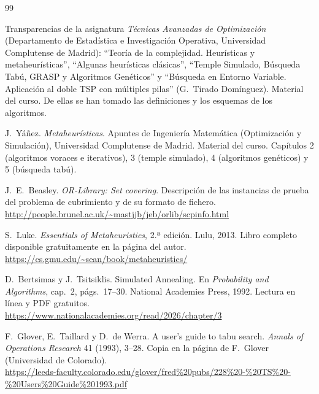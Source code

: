 \begin{thebibliography}{99}

Transparencias de la asignatura \emph{Técnicas Avanzadas de Optimización} (Departamento de
Estadística e Investigación Operativa, Universidad Complutense de Madrid): ``Teoría de la
complejidad. Heurísticas y metaheurísticas'', ``Algunas heurísticas clásicas'', ``Temple
Simulado, Búsqueda Tabú, GRASP y Algoritmos Genéticos'' y ``Búsqueda en Entorno Variable.
Aplicación al doble TSP con múltiples pilas'' (G.~Tirado Domínguez). Material del curso. De
ellas se han tomado las definiciones y los esquemas de los algoritmos.

J.~Yáñez. \emph{Metaheurísticas}. Apuntes de Ingeniería Matemática (Optimización y
Simulación), Universidad Complutense de Madrid. Material del curso. Capítulos 2 (algoritmos
voraces e iterativos), 3 (temple simulado), 4 (algoritmos genéticos) y 5 (búsqueda tabú).

J.~E.~Beasley. \emph{OR-Library: Set covering}. Descripción de las instancias de prueba del
problema de cubrimiento y de su formato de fichero.\\
\url{http://people.brunel.ac.uk/~mastjjb/jeb/orlib/scpinfo.html}

S.~Luke. \emph{Essentials of Metaheuristics}, 2.ª edición. Lulu, 2013. Libro completo
disponible gratuitamente en la página del autor.\\
\url{https://cs.gmu.edu/~sean/book/metaheuristics/}

D.~Bertsimas y J.~Tsitsiklis. Simulated Annealing. En \emph{Probability and Algorithms},
cap.~2, págs.~17--30. National Academies Press, 1992. Lectura en línea y PDF gratuitos.\\
\url{https://www.nationalacademies.org/read/2026/chapter/3}

F.~Glover, E.~Taillard y D.~de Werra. A user's guide to tabu search. \emph{Annals of
Operations Research} 41 (1993), 3--28. Copia en la página de F.~Glover (Universidad de
Colorado).\\
\url{https://leeds-faculty.colorado.edu/glover/fred%20pubs/228%20-%20TS%20-%20Users%20Guide%201993.pdf}


\end{thebibliography}
